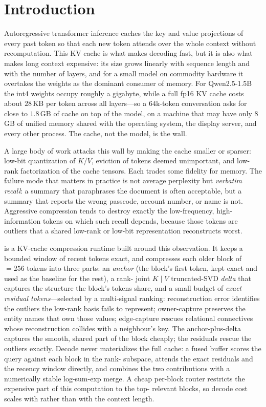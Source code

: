 \section{Introduction}
\label{sec:intro}

Autoregressive transformer inference caches the key and value projections of every past token
so that each new token attends over the whole context without recomputation. This KV cache is
what makes decoding fast, but it is also what makes long context expensive: its size grows
linearly with sequence length and with the number of layers, and for a small model on
commodity hardware it overtakes the weights as the dominant consumer of memory. For
Qwen2.5-1.5B the int4 weights occupy roughly a gigabyte, while a full fp16 KV cache costs about
$28$\,KB per token across all layers---so a $64$k-token conversation asks for close to $1.8$\,GB
of cache on top of the model, on a machine that may have only $8$\,GB of unified memory shared
with the operating system, the display server, and every other process. The cache, not the
model, is the wall.

A large body of work attacks this wall by making the cache smaller or sparser: low-bit
quantization of $K$/$V$, eviction of tokens deemed unimportant, and low-rank factorization of
the cache tensors. Each trades some fidelity for memory. The failure mode that matters in
practice is not average perplexity but \emph{verbatim recall}: a summary that paraphrases the
document is often acceptable, but a summary that reports the wrong passcode, account number, or
name is not. Aggressive compression tends to destroy exactly the low-frequency, high-information
tokens on which such recall depends, because those tokens are outliers that a shared low-rank or
low-bit representation reconstructs worst.

\dkv{} is a KV-cache compression runtime built around this observation. It keeps a bounded
window of recent tokens exact, and compresses each older block of \bs${=}256$ tokens into three
parts: an \emph{anchor} (the block's first token, kept exact and used as the baseline for the
rest), a rank-\rank{} joint $K\!\mid\!V$ truncated-SVD \emph{delta} that captures the structure
the block's tokens share, and a small budget of \emph{exact residual tokens}---selected by a
multi-signal ranking: reconstruction error identifies the outliers the low-rank basis fails to
represent; owner-capture preserves the entity names that own those values; edge-capture rescues
relational connectives whose reconstruction collides with a neighbour's key. The
anchor-plus-delta captures the smooth, shared part of the block cheaply; the residuals rescue
the outliers exactly. Decode never materializes the full cache: a fused buffer scores the query
against each block in the rank-\rank{} subspace, attends the exact residuals and the recency
window directly, and combines the two contributions with a numerically stable log-sum-exp merge.
A cheap per-block router restricts the expensive part of this computation to the top-\topk{}
relevant blocks, so decode cost scales with \topk{} rather than with the context length.

